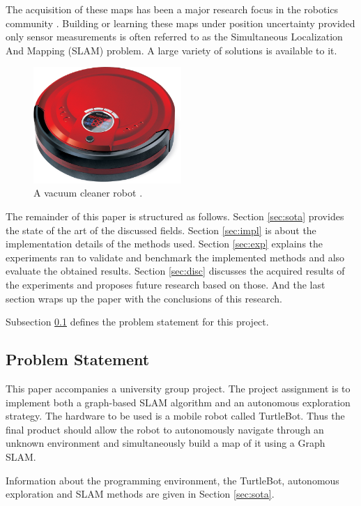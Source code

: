 \documentclass{ba-kecs}
\begin{document}
The acquisition of these maps has been a major research focus in the robotics community \cite{ Grisetti, Montemerlo02, Montemerlo, Thrun}. Building or learning these maps under position uncertainty provided only sensor measurements is often referred to as the Simultaneous Localization And Mapping (SLAM) problem. A large variety of solutions is available to it.
\begin{figure}[h]
	\centering
		\includegraphics[width=0.50\textwidth]{figures/vacuum_cleaner.jpg}
	\caption{A vacuum cleaner robot \citep{VacuumRobot}.}
	\label{fig:vacuum_cleaner}
\end{figure}

The remainder of this paper is structured as follows. Section \ref{sec:sota} provides the state of the art of the discussed fields. Section \ref{sec:impl} is about the implementation details of the methods used. Section \ref{sec:exp} explains the experiments ran to validate and benchmark the implemented methods and also evaluate the obtained results. Section \ref{sec:disc} discusses the acquired results of the experiments and proposes future research based on those. And the last section wraps up the paper with the conclusions of this research.

Subsection \ref{sec:problem} defines the problem statement for this project.
\subsection{Problem Statement}
\label{sec:problem}
This paper accompanies a university group project. The project assignment is to implement both a graph-based SLAM algorithm and an autonomous exploration strategy. The hardware to be used is a mobile robot called TurtleBot. Thus the final product should allow the robot to autonomously navigate through an unknown environment and simultaneously build a map of it using a Graph SLAM.

Information about the programming environment, the TurtleBot, autonomous exploration and SLAM methods are given in Section \ref{sec:sota}.  
\end{document}
